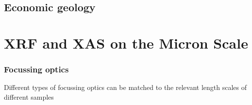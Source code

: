 \documentclass[10pt, xcolor=x11names, compress]{beamer}
\begin{document}
\subsection[Economic geology]{Economic geology}


%
%


\section[Microprobe]{XRF and XAS on the Micron Scale}


\begin{frame}
  \frametitle{Focussing optics}

  Different types of focussing optics can be matched to the relevant
  length scales of different samples


\end{frame}
\end{document}
